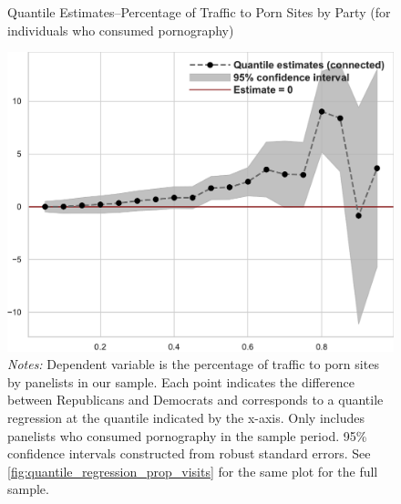 \documentclass[12pt, letterpaper]{article}
\begin{document}
\begin{figure}
	\centering
	\caption{Quantile Estimates--Percentage of Traffic to Porn Sites by Party (for individuals who consumed pornography)}
	\includegraphics[width=.55\linewidth]{../figs/quantile_reg_nonzero_proportion_visits_adult.pdf}
	\caption*{\footnotesize \emph{Notes:} 
		Dependent variable is the percentage of traffic to porn sites by panelists in our sample.
		Each point indicates the difference between Republicans and Democrats and corresponds to a quantile regression at the quantile indicated by the x-axis.
		Only includes panelists who consumed pornography in the sample period.
		95\% confidence intervals constructed from robust standard errors.
		See \cref{fig:quantile_regression_prop_visits} for the same plot for the full sample.
	}
	\label{fig:quantile_regression_prop_visits_nonzeroes}
\end{figure}
\end{document}
